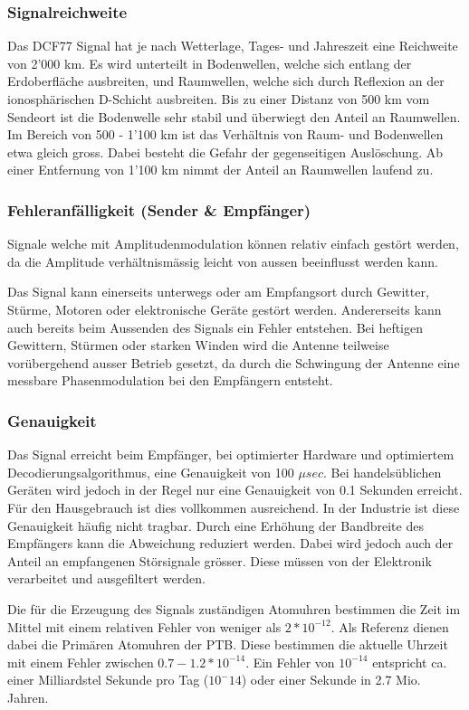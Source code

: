 \subsubsection{Signalreichweite}
Das DCF77 Signal hat je nach Wetterlage, Tages- und Jahreszeit eine Reichweite von 2'000 km. Es wird unterteilt in Bodenwellen, welche sich entlang der Erdoberfläche ausbreiten, und Raumwellen, welche sich durch Reflexion an der ionosphärischen D-Schicht ausbreiten. Bis zu einer Distanz von 500 km vom Sendeort ist die Bodenwelle sehr stabil und überwiegt den Anteil an Raumwellen. Im Bereich von 500 - 1'100 km ist das Verhältnis von Raum- und Bodenwellen etwa gleich gross. Dabei besteht die Gefahr der gegenseitigen Auslöschung. Ab einer Entfernung von 1'100 km nimmt der Anteil an Raumwellen laufend zu.

\subsubsection{Fehleranfälligkeit (Sender \& Empfänger)}
Signale welche mit Amplitudenmodulation können relativ einfach gestört werden, da die Amplitude verhältnismässig leicht von aussen beeinflusst werden kann.

Das Signal kann einerseits unterwegs oder am Empfangsort durch Gewitter, Stürme, Motoren oder elektronische Geräte gestört werden. Andererseits kann auch bereits beim Aussenden des Signals ein Fehler entstehen. Bei heftigen Gewittern, Stürmen oder starken Winden wird die Antenne teilweise vorübergehend ausser Betrieb gesetzt, da durch die Schwingung der Antenne eine messbare Phasenmodulation bei den Empfängern entsteht.

\subsubsection{Genauigkeit}
Das Signal erreicht beim Empfänger, bei optimierter Hardware und optimiertem Decodierungsalgorithmus, eine Genauigkeit von 100 ${\mu}sec$. Bei handelsüblichen Geräten wird jedoch in der Regel nur eine Genauigkeit von 0.1 Sekunden erreicht. Für den Hausgebrauch ist dies vollkommen ausreichend.
In der Industrie ist diese Genauigkeit häufig nicht tragbar.
Durch eine Erhöhung der Bandbreite des Empfängers kann die Abweichung reduziert werden. Dabei wird jedoch auch der Anteil an empfangenen Störsignale grösser. Diese müssen von der Elektronik verarbeitet und ausgefiltert werden.

Die für die Erzeugung des Signals zuständigen Atomuhren bestimmen die Zeit im Mittel mit einem relativen Fehler von weniger als $2*10^{-12}$. Als Referenz dienen dabei die Primären Atomuhren der PTB.
Diese bestimmen die aktuelle Uhrzeit mit einem Fehler zwischen $0.7 - 1.2 * 10^{-14}$. Ein Fehler von $10^{-14}$ entspricht ca. einer Milliardstel Sekunde pro Tag ($10^-14$) oder einer Sekunde in 2.7 Mio. Jahren.

